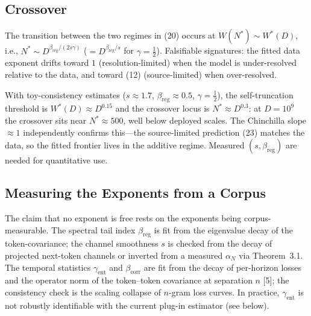 \documentclass[entropy,article,submit,moreauthors,pdftex]{mdpi}
\begin{document}
\subsection{Crossover}
\begin{conjecture}
\label{conj:crossover}
The transition between the two regimes in (20) occurs at
$W(N^*)\sim W^*(D)$, i.e., $N^*\sim D^{\beta_{\mathrm{reg}}/(2s\gamma)}$
($=D^{\beta_{\mathrm{reg}}/s}$ for $\gamma=\frac12$). Falsifiable signatures: the
fitted data exponent drifts toward $1$ (resolution-limited) when the model is
under-resolved relative to the data, and toward (12)
(source-limited) when over-resolved.
\end{conjecture}

With toy-consistency estimates ($s\!\approx\!1.7$,
$\beta_{\mathrm{reg}}\!\approx\!0.5$, $\gamma\!=\!\tfrac12$), the self-truncation
threshold is $W^*(D)\!\approx\!D^{0.15}$ and the crossover locus is
$N^*\!\approx\!D^{0.3}$: at $D=10^9$ the crossover sits near $N^*\!\approx\!500$,
well below deployed scales.  The Chinchilla slope $\approx\!1$ independently
confirms this---the source-limited prediction (23) matches the
data, so the fitted frontier lives in the additive regime.  Measured
$(s,\beta_{\mathrm{reg}})$ are needed for quantitative use.

\subsection{Measuring the Exponents from a Corpus}
\label{sec:measurement}

The claim that no exponent is free rests on the exponents being
corpus-measurable. The spectral tail index $\beta_{\mathrm{reg}}$ is fit from the
eigenvalue decay of the token-covariance; the channel smoothness $s$ is checked
from the decay of projected next-token channels or inverted from a measured
$\alpha_N$ via Theorem~3.1. The temporal statistics $\gamma_{\mathrm{ent}}$
and $\beta_{\mathrm{corr}}$ are fit from the decay of per-horizon losses and the
operator norm of the token--token covariance at separation $n$
[5]; the consistency check is the scaling collapse of
$n$-gram loss curves. In practice, $\gamma_{\mathrm{ent}}$ is not robustly
identifiable with the current plug-in estimator (see below).
\end{document}
